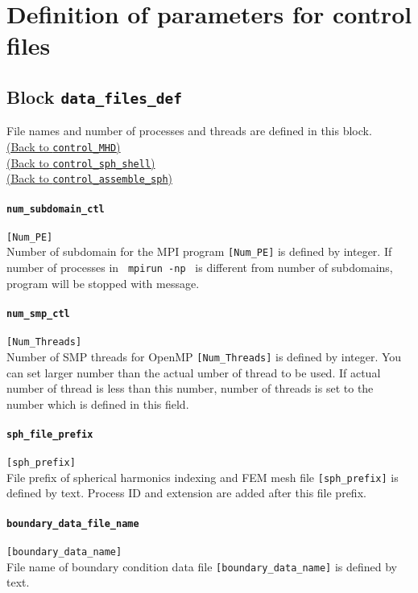 \section{Definition of parameters for control files}
\label{section:def_control}

\subsection{Block {\tt data\_files\_def}}
\label{href_t:data_files_def}
File names and number of processes and threads are defined in this block. \\
\hyperref[href_i:MHD_control]{(Back to {\tt control\_MHD})} \\
\hyperref[href_i:spherical_shell_ctl]{(Back to {\tt control\_sph\_shell})} \\
\hyperref[href_i:assemble_control]{(Back to {\tt control\_assemble\_sph})}

\paragraph{\tt num\_subdomain\_ctl}
\label{href_t:num_subdomain_ctl}
\verb|[Num_PE]| \\
Number of subdomain for the MPI program \verb|[Num_PE]| is defined by integer. If number of processes in \verb| mpirun -np | is different from number of subdomains, program will be stopped with message.

\paragraph{\tt num\_smp\_ctl}
\label{href_t:num_smp_ctl}
\verb|[Num_Threads]| \\
Number of SMP threads for OpenMP \verb|[Num_Threads]| is defined by integer. You can set larger number than the actual umber of thread to be used. If actual number of thread is less than this number, number of threads is set to the number which is defined in this field.

\paragraph{\tt sph\_file\_prefix}
\label{href_t:sph_file_prefix}
\verb|[sph_prefix]| \\
File prefix of spherical harmonics indexing and FEM mesh file \verb|[sph_prefix]| is defined by text. Process ID and extension are added after this file prefix.

\paragraph{\tt boundary\_data\_file\_name}
\label{href_t:boundary_data_file_name}
\verb|[boundary_data_name]| \\
File name of boundary condition data file \verb|[boundary_data_name]| is defined by text. 

